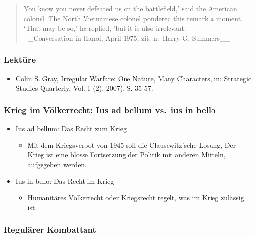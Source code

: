 {}\documentclass[a4paper]{article}
\providecommand{\tightlist}{\setlength{\itemsep}{1mm}\setlength{\parskip}{1mm}}
\begin{document}
\begin{quote}
	You know you never defeated us on the battlefield,' said the American
	colonel. The North Vietnamese colonel pondered this remark a moment.
	`That may be so,' he replied, 'but it is also irrelevant.\\
	- \_Conversation in Hanoi, April 1975, zit. n.~Harry G. Summers\_\_
\end{quote}

\subsubsection{Lektüre}\label{lektuxfcre-3}

\begin{itemize}
	\tightlist
	\item
	      Colin S. Gray, Irregular Warfare: One Nature, Many Characters, in:
	      Strategic Studies Quarterly, Vol. 1 (2), 2007), S. 35-57.
\end{itemize}

\subsubsection{Krieg im Völkerrecht: Ius ad bellum vs.~ius in
	bello}\label{krieg-im-vuxf6lkerrecht-ius-ad-bellum-vs.-ius-in-bello}

\begin{itemize}
	\tightlist
	\item
	      Ius ad bellum: Das Recht zum Krieg

	      \begin{itemize}
		      \tightlist
		      \item
		            Mit dem Kriegsverbot von 1945 soll die Clausewitz'sche Losung, Der
		            Krieg ist eine blosse Fortsetzung der Politik mit anderen Mitteln,
		            aufgegeben werden.
	      \end{itemize}
	\item
	      Ius in bello: Das Recht im Krieg

	      \begin{itemize}
		      \tightlist
		      \item
		            Humanitäres Völkerrecht oder Kriegsrecht regelt, was im Krieg
		            zulässig ist.
	      \end{itemize}
\end{itemize}

\subsubsection{Regulärer Kombattant}\label{reguluxe4rer-kombattant}
\end{document}
